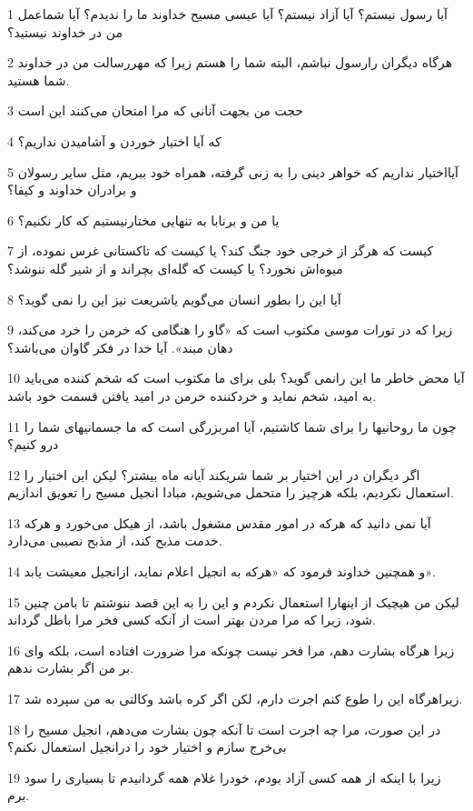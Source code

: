 \par 1 آیا رسول نیستم؟ آیا آزاد نیستم؟ آیا عیسی مسیح خداوند ما را ندیدم؟ آیا شماعمل من در خداوند نیستید؟
\par 2 هرگاه دیگران رارسول نباشم، البته شما را هستم زیرا که مهررسالت من در خداوند شما هستید.
\par 3 حجت من بجهت آنانی که مرا امتحان می‌کنند این است
\par 4 که آیا اختیار خوردن و آشامیدن نداریم؟
\par 5 آیااختیار نداریم که خواهر دینی را به زنی گرفته، همراه خود ببریم، مثل سایر رسولان و برادران خداوند و کیفا؟
\par 6 یا من و برنابا به تنهایی مختارنیستیم که کار نکنیم؟
\par 7 کیست که هرگز از خرجی خود جنگ کند؟ یا کیست که تاکستانی غرس نموده، از میوه‌اش نخورد؟ یا کیست که گله‌ای بچراند و از شیر گله ننوشد؟
\par 8 آیا این را بطور انسان می‌گویم یاشریعت نیز این را نمی گوید؟
\par 9 زیرا که در تورات موسی مکتوب است که «گاو را هنگامی که خرمن را خرد می‌کند، دهان مبند». آیا خدا در فکر گاوان می‌باشد؟
\par 10 آیا محض خاطر ما این رانمی گوید؟ بلی برای ما مکتوب است که شخم کننده می‌باید به امید، شخم نماید و خردکننده خرمن در امید یافتن قسمت خود باشد.
\par 11 چون ما روحانیها را برای شما کاشتیم، آیا امربزرگی است که ما جسمانیهای شما را درو کنیم؟
\par 12 اگر دیگران در این اختیار بر شما شریکند آیانه ماه بیشتر؟ لیکن این اختیار را استعمال نکردیم، بلکه هرچیز را متحمل می‌شویم، مبادا انجیل مسیح را تعویق اندازیم.
\par 13 آیا نمی دانید که هرکه در امور مقدس مشغول باشد، از هیکل می‌خورد و هرکه خدمت مذبح کند، از مذبح نصیبی می‌دارد.
\par 14 و همچنین خداوند فرمود که «هرکه به انجیل اعلام نماید، ازانجیل معیشت یابد».
\par 15 لیکن من هیچیک از اینهارا استعمال نکردم و این را به این قصد ننوشتم تا بامن چنین شود، زیرا که مرا مردن بهتر است از آنکه کسی فخر مرا باطل گرداند.
\par 16 زیرا هرگاه بشارت دهم، مرا فخر نیست چونکه مرا ضرورت افتاده است، بلکه وای بر من اگر بشارت ندهم.
\par 17 زیراهرگاه این را طوع کنم اجرت دارم، لکن اگر کره باشد وکالتی به من سپرده شد.
\par 18 در این صورت، مرا چه اجرت است تا آنکه چون بشارت می‌دهم، انجیل مسیح را بی‌خرج سازم و اختیار خود را درانجیل استعمال نکنم؟
\par 19 زیرا با اینکه از همه کسی آزاد بودم، خودرا غلام همه گردانیدم تا بسیاری را سود برم.
